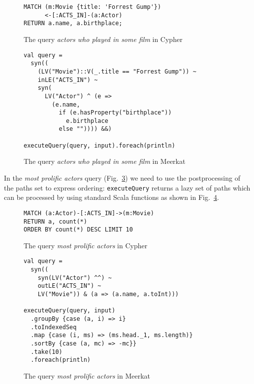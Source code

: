 \begin{figure}[h]
\begin{lstlisting}
MATCH (m:Movie {title: 'Forrest Gump'})
      <-[:ACTS_IN]-(a:Actor)
RETURN a.name, a.birthplace;
\end{lstlisting}
\caption{The query \emph{actors who played in some film} in Cypher}
\label{fig:Q1_C}
\end{figure}


\begin{figure}[h]
\begin{lstlisting}
val query =
  syn((
    (LV("Movie")::V(_.title == "Forrest Gump")) ~
    inLE("ACTS_IN") ~
    syn(
      LV("Actor") ^ (e =>
        (e.name,
          if (e.hasProperty("birthplace"))
            e.birthplace
          else "")))) &&)

executeQuery(query, input).foreach(println)
\end{lstlisting}
\caption{The query \emph{actors who played in some film} in Meerkat}
\label{fig:Q1_M}
\end{figure}


In the \emph{most prolific actors} query (Fig.~\ref{fig:Q2_C}) we need to use the postprocessing of the paths set to express ordering: \lstinline{executeQuery} returns a lazy set of paths which can be processed by using standard Scala functions as shown in Fig.~\ref{fig:Q2_M}.

\begin{figure}[h]
\begin{lstlisting}
MATCH (a:Actor)-[:ACTS_IN]->(m:Movie)
RETURN a, count(*)
ORDER BY count(*) DESC LIMIT 10
\end{lstlisting}
\caption{The query \emph{most prolific actors} in Cypher}
\label{fig:Q2_C}
\end{figure}


\begin{figure}[h]
\begin{lstlisting}
val query =
  syn((
    syn(LV("Actor") ^^) ~
    outLE("ACTS_IN") ~
    LV("Movie")) & (a => (a.name, a.toInt)))

executeQuery(query, input)
  .groupBy {case (a, i) => i}
  .toIndexedSeq
  .map {case (i, ms) => (ms.head._1, ms.length)}
  .sortBy {case (a, mc) => -mc}}
  .take(10)
  .foreach(println)

\end{lstlisting}
\caption{The query \emph{most prolific actors} in Meerkat}
\label{fig:Q2_M}
\end{figure}

